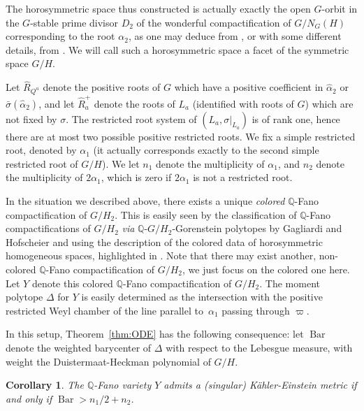 \documentclass[JEP,XML,SOM,Unicode, NoEqCountersInSection, NoFloatCountersInSection]{cedram}
\theoremstyle{plain}
\newtheorem{cor}[thm]{Corollary}
\theoremstyle{definition}
\DeclareMathOperator{\barDH}{Bar}
\newcommand{\ha}{\hat{\alpha}}
\newcommand{\Roots}{\hat{R}}
\begin{document}
The horosymmetric space thus constructed is actually exactly the open $G$-orbit
in the $G$-stable prime divisor $D_2$ of the wonderful compactification of $G/N_G(H)$
corresponding to the root $\alpha_2$, as one may deduce from \cite{DCP83}, or
with some different details, from \cite{DelHoro}.
We will call such a horosymmetric space a facet of the symmetric space $G/H$.

Let $\Roots_{Q^u}$ denote the positive roots of $G$ which have a positive coefficient
in $\ha_2$ or $\bar{\sigma}(\ha_2)$, and let $\Roots_{a}^+$ denote the roots
of $L_a$ (identified with roots of $G$) which are not fixed by $\sigma$.
The restricted root system of $(L_a,\sigma|_{L_a})$ is of rank one, hence
there are at most two possible positive restricted roots.
We fix a simple restricted root, denoted by $\alpha_1$ (it actually corresponds
exactly to the second simple restricted root of $G/H$). We let $n_1$ denote the
multiplicity of $\alpha_1$, and $n_2$ denote the multiplicity of $2\alpha_1$,
which is zero if $2\alpha_1$ is not a restricted root.

In the situation we described above, there exists a unique \emph{colored} $\mathbb{Q}$-Fano
compactification of $G/H_2$. This is easily seen by the classification of $\mathbb{Q}$-Fano
compactifications of $G/H_2$ \emph{via} $\mathbb{Q}$-$G/H_2$-Gorenstein polytopes
by Gagliardi and Hofscheier \cite{GH15_fano} and
using the description of the colored data of horosymmetric homogeneous spaces,
highlighted in \cite{DelHoro}.
Note that there may exist another, non-colored $\mathbb{Q}$-Fano compactification of $G/H_2$,
we just focus on the colored one here.
Let $Y$ denote this colored $\mathbb{Q}$-Fano compactification of $G/H_2$.
The moment polytope $\Delta$ for $Y$ is easily determined as
the intersection with the positive restricted Weyl chamber of
the line parallel to~$\alpha_1$ passing through $\varpi$.

In this setup, Theorem~\ref{thm:ODE} has the following consequence:
let $\barDH$ denote the weighted barycenter of $\Delta$ with respect to the
Lebesgue measure, with weight the Duistermaat-Heckman polynomial of $G/H$.

\begin{cor}
\label{cor:facets}
The $\mathbb{Q}$-Fano variety $Y$ admits a (singular) Kähler-Einstein metric
if and only if $\barDH>n_1/2+n_2$.
\end{cor}
\end{document}

